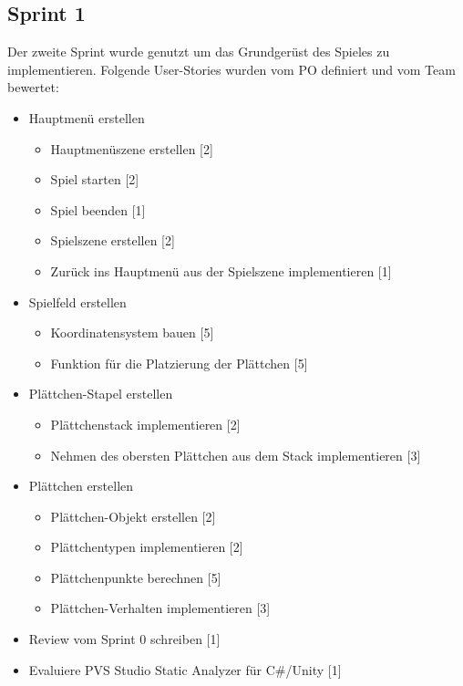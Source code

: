 \documentclass[../main.tex]{subfiles}
\begin{document}
	\subsection{Sprint 1}
	
	\par Der zweite Sprint wurde genutzt um das Grundgerüst des Spieles zu implementieren. Folgende User-Stories wurden vom PO definiert und vom Team bewertet:
	
	\begin{itemize}
		\item Hauptmenü erstellen
		\begin{itemize}
			\item Hauptmenüszene erstellen [2]
			\item Spiel starten [2]
			\item Spiel beenden [1]
			\item Spielszene erstellen [2]
			\item Zurück ins Hauptmenü aus der Spielszene implementieren [1]
		\end{itemize}
		\item Spielfeld erstellen
		\begin{itemize}
			\item Koordinatensystem bauen [5]
			\item Funktion für die Platzierung der Plättchen [5]
		\end{itemize}
		\item Plättchen-Stapel erstellen
		\begin{itemize}
			\item Plättchenstack implementieren [2]
			\item Nehmen des obersten Plättchen aus dem Stack implementieren [3]
		\end{itemize}
		\item Plättchen erstellen
		\begin{itemize}
			\item Plättchen-Objekt erstellen [2]
			\item Plättchentypen implementieren [2]
			\item Plättchenpunkte berechnen [5]
			\item Plättchen-Verhalten implementieren [3]
		\end{itemize}
		\item Review vom Sprint 0 schreiben [1]
		\item Evaluiere PVS Studio Static Analyzer für C\#/Unity [1]
	\end{itemize} 
\end{document}
